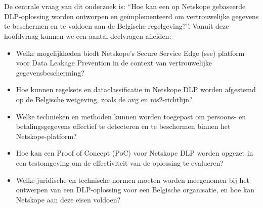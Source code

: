 

\section{}%
\label{sec:onderzoeksvraag}

De centrale vraag van dit onderzoek is: “Hoe kan een op Netskope gebaseerde DLP-oplossing worden ontworpen en geïmplementeerd om vertrouwelijke gegevens te beschermen en te voldoen aan de Belgische regelgeving?”. 
Vanuit deze hoofdvraag kunnen we een aantal deelvragen afleiden:

\begin{itemize}
    \item Welke mogelijkheden biedt Netskope's Secure Service Edge (\gls{sse}) platform voor Data Leakage Prevention in de context van vertrouwelijke gegevensbescherming?
    \item Hoe kunnen regelsets en dataclassificatie in Netskope DLP worden afgestemd op de Belgische wetgeving, zoals de \gls{avg} en \gls{nis2}-richt\-lijn?
    \item Welke technieken en methoden kunnen worden toegepast om persoons- en betalingsgegevens effectief te detecteren en te beschermen binnen het Net\-skope-platform?
    \item Hoe kan een Proof of Concept (PoC) voor Netskope DLP worden opgezet in een testomgeving om de effectiviteit van de oplossing te evalueren?
    \item Welke juridische en technische normen moeten worden meegenomen bij het ontwerpen van een DLP-oplossing voor een Belgische organisatie, en hoe kan Netskope aan deze eisen voldoen?
\end{itemize}


